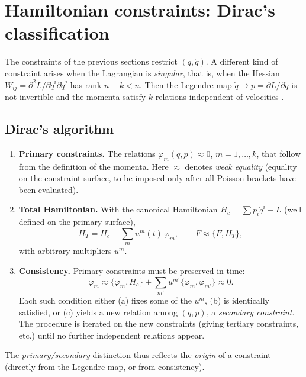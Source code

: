 \documentclass[11pt,a4paper]{article}
\theoremstyle{definition}
\theoremstyle{plain}
\theoremstyle{remark}
\newcommand{\Pois}[2]{\{#1,#2\}}
\newcommand{\weq}{\approx}                 %
\begin{document}
\section{Hamiltonian constraints: Dirac's classification}\label{sec:dirac}
The constraints of the previous sections restrict $(q,\dot q)$. A different kind of
constraint arises when the Lagrangian is \emph{singular}, that is, when the Hessian
$W_{ij}=\partial^2L/\partial\dot q^i\partial\dot q^j$ has rank $n-k<n$. Then the Legendre map
$\dot q\mapsto p=\partial L/\partial\dot q$ is not invertible and the momenta satisfy $k$
relations independent of velocities \cite{Dirac1950,Dirac1964,HenneauxTeitelboim1992}.

\subsection{Dirac's algorithm}
\begin{enumerate}[leftmargin=1.6em]
\item \textbf{Primary constraints.} The relations $\varphi_m(q,p)\weq0$, $m=1,\dots,k$, that
  follow from the definition of the momenta. Here $\weq$ denotes \emph{weak equality}
  (equality on the constraint surface, to be imposed only after all Poisson brackets have been
  evaluated).
\item \textbf{Total Hamiltonian.} With the canonical Hamiltonian
  $H_c=\sum p_i\dot q^i-L$ (well defined on the primary surface),
  \begin{equation}\label{eq:HT}
    H_T=H_c+\sum_{m}u^m(t)\,\varphi_m,\qquad \dot F\weq\Pois F{H_T},
  \end{equation}
  with arbitrary multipliers $u^m$.
\item \textbf{Consistency.} Primary constraints must be preserved in time:
  \[
    \dot\varphi_m\weq\Pois{\varphi_m}{H_c}+\sum_{m'}u^{m'}\Pois{\varphi_m}{\varphi_{m'}}\weq0 .
  \]
  Each such condition either (a) fixes some of the $u^m$, (b) is identically satisfied, or
  (c) yields a new relation among $(q,p)$, a \emph{secondary constraint}. The procedure is
  iterated on the new constraints (giving tertiary constraints, etc.) until no further
  independent relations appear.
\end{enumerate}
The \emph{primary/secondary} distinction thus reflects the \emph{origin} of a constraint
(directly from the Legendre map, or from consistency).
\end{document}
